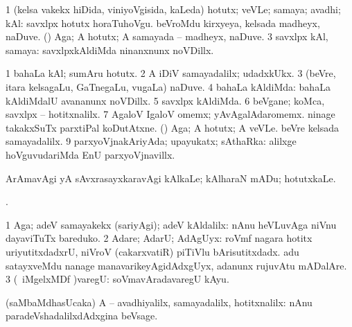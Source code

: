 {{{{{{\bentry
{} 
\gl{\nA}
\expl{}
\bmng
\bnum
\num{1} (kelsa \mo vakekx hiDida, viniyoVgisida, kaLeda) hotutx; veVLe; samaya; avadhi; kAl:  savxlpx hotutx horaTuhoVgu. 
\banum
{} beVroMdu kirxyeya, kelsada madheyx, naDuve. 
 (\kAparx) Aga; A hotutx; A samayada -- madheyx, naDuve. 
\eanum
\numie
\num{3} savxlpx kAl, samaya:  savxlpxkAldiMda ninanxnunx noVDillx. 
\enum
\emng

\noindent 
\gl{\pagu}
\expl{}
\bmng
\bnum
\num{1}  bahaLa kAl; sumAru hotutx. 
\num{2}  A iDiV samayadalilx; udadxkUkx. 
\num{3}  (beVre, itara kelsagaLu, GaTnegaLu, \mo vugaLa) naDuve. 
\num{4}  bahaLa kAldiMda:  bahaLa kAldiMdalU avananunx noVDillx. 
\num{5}  savxlpx kAldiMda. 
\num{6}  beVgane; koMca, savxlpx -- hotitxnalilx. 
\num{7}  AgaloV IgaloV omemx; yAvAgalAdaromemx.  ninage takakxSuTx parxtiPal koDutAtxne. 
  
\banum
{} (\kAparx) Aga; A hotutx; A veVLe. 
 beVre kelsada samayadalilx. 
\hypertarget{while(1) pagu(9)}{} 
\eanum
\numie
\num{9}  parxyoVjnakAriyAda; upayukatx; sAthaRka:  alilxge hoVguvudariMda EnU parxyoVjnavillx. 
\enum
\emng
\eentry

\bentry
{} 
\gl{\sakirx}
\expl{}
\bmng
ArAmavAgi yA sAvxrasayxkaravAgi kAlkaLe; kAlharaN mADu; hotutxkaLe. 
\emng

\noindent 
\gl{\pagu}
\expl{}
\bmng
{}. 
\emng
\eentry

\bentry
{} 
\gl{\saMavayx}
\bmng
\bnum
\num{1} Aga; adeV samayakekx (sariyAgi); adeV kAldalilx:  nAnu heVLuvAga niVnu dayaviTuTx bareduko. 
\num{2} Adare; AdarU; AdAgUyx:  roVmf nagara hotitx uriyutitxdadxrU, niVroV (cakarxvatiR) piTiVlu bArisutitxdadx.  adu satayxveMdu nanage manavarikeyAgidAdxgUyx, adanunx rujuvAtu mADalAre. 
\num{3} (\kanu\ iMgelxMDf \parx)varegU:  soVmavAradavaregU kAyu. 
\enum
\emng
\eentry

\bentry
{} 
\gl{\kirxvi}
\expl{}
\bmng
(saMbaMdhasUcaka) A -- avadhiyalilx, samayadalilx, hotitxnalilx:  nAnu paradeVshadalilxdAdxgina beVsage. 
\emng
\eentry

}}}}}}

